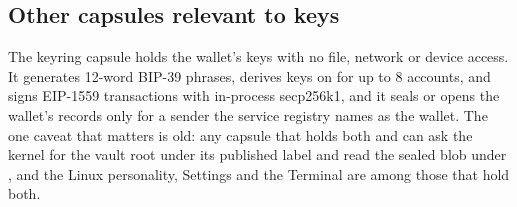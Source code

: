 \subsection{Other capsules relevant to keys}

The keyring capsule holds the wallet's keys with no file, network or device access. It generates 12-word BIP-39 phrases, derives keys on  for up to 8 accounts, and signs EIP-1559 transactions with in-process secp256k1, and it seals or opens the wallet's records only for a sender the service registry names as the wallet. The one caveat that matters is old: any capsule that holds both  and  can ask the kernel for the vault root under its published label and read the sealed blob under , and the Linux personality, Settings and the Terminal are among those that hold both.

